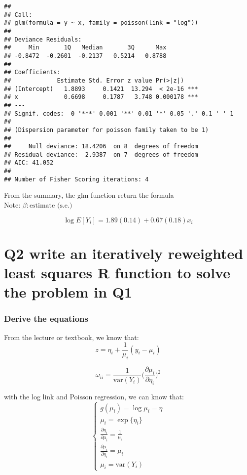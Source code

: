 \documentclass[]{article}
\begin{document}
\begin{verbatim}
## 
## Call:
## glm(formula = y ~ x, family = poisson(link = "log"))
## 
## Deviance Residuals: 
##     Min       1Q   Median       3Q      Max  
## -0.8472  -0.2601  -0.2137   0.5214   0.8788  
## 
## Coefficients:
##             Estimate Std. Error z value Pr(>|z|)    
## (Intercept)   1.8893     0.1421  13.294  < 2e-16 ***
## x             0.6698     0.1787   3.748 0.000178 ***
## ---
## Signif. codes:  0 '***' 0.001 '**' 0.01 '*' 0.05 '.' 0.1 ' ' 1
## 
## (Dispersion parameter for poisson family taken to be 1)
## 
##     Null deviance: 18.4206  on 8  degrees of freedom
## Residual deviance:  2.9387  on 7  degrees of freedom
## AIC: 41.052
## 
## Number of Fisher Scoring iterations: 4
\end{verbatim}

From the summary, the glm function return the formula\\
Note: \(\beta: \text{estimate (s.e.)}\)

\[\log{E[Y_i]} = 1.89 (0.14) + 0.67 (0.18) x_i\]

\section{Q2 write an iteratively reweighted least squares R function to
solve the problem in
Q1}\label{q2-write-an-iteratively-reweighted-least-squares-r-function-to-solve-the-problem-in-q1}

\subsubsection{Derive the equations}\label{derive-the-equations}

From the lecture or textbook, we know that:
\[z = \eta_i + \frac{1}{\mu_i} (y_i - \mu_i)\]

\[\omega_{ii} = \frac{1}{\text{var}(Y_i)} \Big( \frac{\partial \mu_i}{\partial \eta_i} \Big)^2\]

with the log link and Poisson regression, we can know that:
\[\begin{cases}
g(\mu_i) = \log{\mu_i} = \eta \\
\mu_i = \exp{ \{ \eta_i \}}   \\
\frac{\partial \eta_i}{\partial \mu_i} = \frac{1}{\mu_i} \\
\frac{\partial \mu_i}{\partial \eta_i} = \mu_i \\
\mu_i = \text{var}(Y_i)
\end{cases}\]
\end{document}
